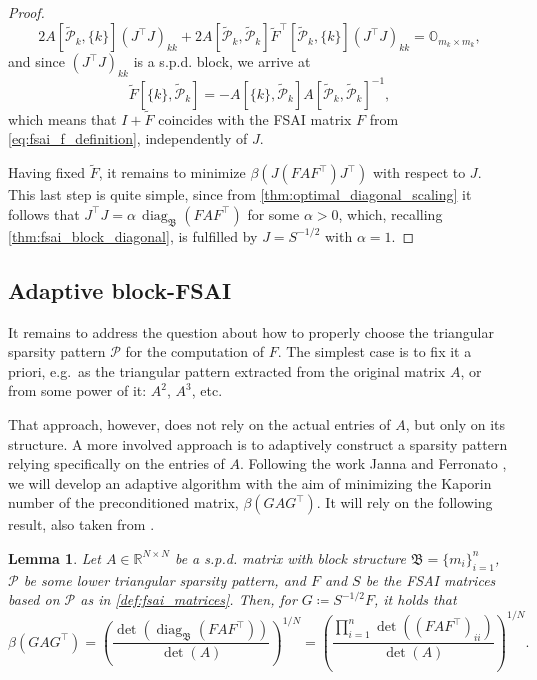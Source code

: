 \documentclass[a4paper]{article}
\DeclareMathOperator{\diag}{diag}
\theoremstyle{plain}
\newtheorem{lemma}{Lemma}[section]
\theoremstyle{definition}
\theoremstyle{remark}
\begin{document}
\begin{proof}
	\begin{equation*}
		2 A[\tilde{\mathcal{P}}_k, \{k\}] (J^{\top}J)_{kk} + 2 A[\tilde{\mathcal{P}}_k, \tilde{\mathcal{P}}_k] \tilde{F}^{\top}[\tilde{\mathcal{P}}_k, \{k\}] (J^{\top}J)_{kk} = \mathbb{O}_{m_k \times m_k},
	\end{equation*}
	and since \((J^{\top}J)_{kk}\) is a s.p.d. block, we arrive at
	\begin{equation*}
		\tilde{F}[\{k\}, \tilde{\mathcal{P}}_k] = - A[\{k\}, \tilde{\mathcal{P}}_k] A[\tilde{\mathcal{P}}_k, \tilde{\mathcal{P}}_k]^{-1},
	\end{equation*}
	which means that \(I + \tilde{F}\) coincides with the FSAI matrix \(F\) from \eqref{eq:fsai_f_definition}, independently of \(J\).
	
	Having fixed \(\tilde{F}\), it remains to minimize \(\beta\left( J (F A F^{\top})  J^{\top}\right)\) with respect to \(J\). This last step is quite simple, since from \cref{thm:optimal_diagonal_scaling} it follows that
	\(J^{\top}J = \alpha \, \diag_{\mathfrak{B}}(F A F^{\top})\) for some \(\alpha > 0\), which, recalling \cref{thm:fsai_block_diagonal}, is fulfilled by \(J = S^{-1/2}\) with \(\alpha = 1\).
\end{proof}


\subsection{Adaptive block-FSAI}\label{sec:adaptive_fsai}

It remains to address the question about how to properly choose the triangular sparsity pattern \(\mathcal{P}\) for the computation of \(F\). The simplest case is to fix it a priori, e.g.\ as the triangular pattern extracted from the original matrix \(A\), or from some power of it: \(A^2\), \(A^3\), etc.

That approach, however, does not rely on the actual entries of \(A\), but only on its structure. A more involved approach is to adaptively construct a sparsity pattern relying specifically on the entries of \(A\). Following the work Janna and Ferronato \cite{Janna2011}, we will develop an adaptive algorithm with the aim of minimizing the Kaporin number of the preconditioned matrix, \(\beta(G A G^{\top})\). It will rely on the following result, also taken from \cite{Janna2011}.

\begin{lemma}
	Let \(A \in \mathbb{R}^{N\times N}\) be a s.p.d. matrix with block structure \(\mathfrak{B} = \{m_i\}_{i=1}^n\), \(\mathcal{P}\) be some lower triangular sparsity pattern, and \(F\) and \(S\) be the FSAI matrices based on \(\mathcal{P}\) as in \cref{def:fsai_matrices}. Then, for \(G \coloneqq S^{-1/2} F\), it holds that
	\begin{equation*}
		\beta(G A G^{\top}) = \left( \frac{\det(\diag_{\mathfrak{B}}(F A F^{\top}))}{\det(A)} \right)^{1/N} = \left( \frac{\prod_{i=1}^n\det((F A F^{\top})_{ii})}{\det(A)} \right)^{1/N}.
	\end{equation*}
\end{lemma}
\end{document}
